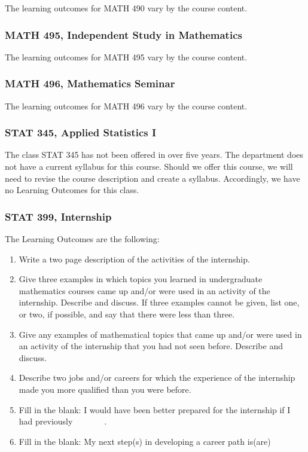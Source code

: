 \documentclass[11pt]{article}
\newenvironment{alphalist}{
\begin{enumerate}[label=(\arabic*),widest=107 ,leftmargin=25pt, itemsep=0pt]}
{\end{enumerate}}
\begin{document}
The learning outcomes for MATH 490 vary by the course content.

\subsubsection{MATH 495, Independent Study in Mathematics}


The learning outcomes for MATH 495 vary by the course content.

\subsubsection{MATH 496, Mathematics Seminar}

The learning outcomes for MATH 496 vary by the course content.


\subsubsection{STAT 345, Applied Statistics I}

The class STAT 345 has not been offered in over five years.  The
department does not have a current syllabus for this course. Should we offer this course,  we will need to revise
the course description and create a syllabus. Accordingly, we have no Learning Outcomes for this class.


\subsubsection{STAT 399, Internship}

The Learning Outcomes are the following:
\begin{alphalist}
    \item Write a two page description of the activities of the internship.
    \item Give three examples in which topics you learned in 
    undergraduate mathematics courses came up and/or were used in an activity of the internship. Describe and discuss. If three examples cannot be given, list one, or two, if possible, and say that there were less than three.
    \item Give any examples of mathematical topics that came up and/or were used in an activity of the internship that you had not seen before. Describe and discuss. 
    \item Describe two jobs and/or careers for which the experience of the internship made you more qualified than you were before.
    \item Fill in the blank: I would have been better prepared for the internship if I had previously \underline{$\phantom{xxxxxx}$}.
    \item Fill in the blank: My next step(s) in developing a career path is(are) \underline{$\phantom{xxxxxx}$}
\end{alphalist}
\end{document}
